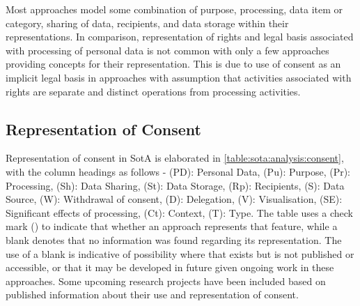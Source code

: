 Most approaches model some combination of purpose, processing, data item or category, sharing of data, recipients, and data storage within their representations. In comparison, representation of rights and legal basis associated with processing of personal data is not common with only a few approaches providing concepts for their representation. This is due to use of consent as an implicit legal basis in approaches with assumption that activities associated with rights are separate and distinct operations from processing activities. 

\subsection{Representation of Consent}\label{sota:analysis:consent}
Representation of consent in SotA is elaborated in \autoref{table:sota:analysis:consent}, with the column headings as follows - (PD): Personal Data, (Pu): Purpose, (Pr): Processing, (Sh): Data Sharing, (St): Data Storage, (Rp): Recipients, (S): Data Source, (W): Withdrawal of consent, (D): Delegation, (V): Visualisation, (SE): Significant effects of processing, (Ct): Context, (T): Type.
The table uses a check mark (\cmark) to indicate that whether an approach represents that feature, while a blank denotes that no information was found regarding its representation. The use of a blank is indicative of possibility where that exists but is not published or accessible, or that it may be developed in future given ongoing work in these approaches.
Some upcoming research projects have been included based on published information about their use and representation of consent.
